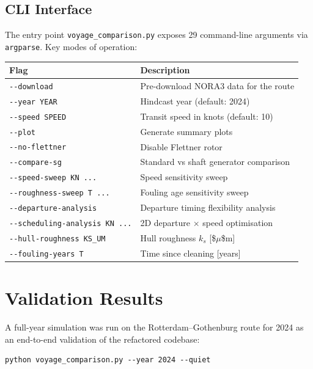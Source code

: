 \documentclass[a4paper,11pt]{article}
\begin{document}
\subsection{CLI Interface}
\label{sec:org8b630dd}

The entry point \texttt{voyage\_comparison.py} exposes 29 command-line arguments via
\texttt{argparse}.  Key modes of operation:

\begin{center}
\begin{tabular}{lp{10cm}}
\toprule
Flag & Description\\[0pt]
\midrule
\texttt{-{}-{}download} & Pre-download NORA3 data for the route\\[0pt]
\texttt{-{}-{}year YEAR} & Hindcast year (default: 2024)\\[0pt]
\texttt{-{}-{}speed SPEED} & Transit speed in knots (default: 10)\\[0pt]
\texttt{-{}-{}plot} & Generate summary plots\\[0pt]
\texttt{-{}-{}no-flettner} & Disable Flettner rotor\\[0pt]
\texttt{-{}-{}compare-sg} & Standard vs shaft generator comparison\\[0pt]
\texttt{-{}-{}speed-sweep KN ...} & Speed sensitivity sweep\\[0pt]
\texttt{-{}-{}roughness-sweep T ...} & Fouling age sensitivity sweep\\[0pt]
\texttt{-{}-{}departure-analysis} & Departure timing flexibility analysis\\[0pt]
\texttt{-{}-{}scheduling-analysis KN ...} & 2D departure \(\times\) speed optimisation\\[0pt]
\texttt{-{}-{}hull-roughness KS\_UM} & Hull roughness \(k_s\) [\$\(\mu\)\$m]\\[0pt]
\texttt{-{}-{}fouling-years T} & Time since cleaning [years]\\[0pt]
\bottomrule
\end{tabular}
\end{center}

\section{Validation Results}
\label{sec:org55abab9}

A full-year simulation was run on the Rotterdam--Gothenburg route for 2024 as an
end-to-end validation of the refactored codebase:

\begin{verbatim}
python voyage_comparison.py --year 2024 --quiet
\end{verbatim}
\end{document}
